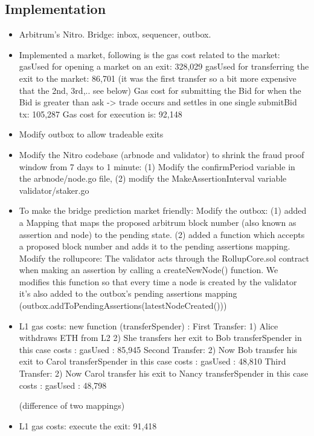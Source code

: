 \subsection{Implementation} 

\begin{itemize}
\item Arbitrum's Nitro. Bridge: inbox, sequencer, outbox.
\item Implemented a market, following is the gas cost related to the market:
gasUsed for opening a market on an exit: 328,029
gasUsed for transferring the exit to the market:  86,701 (it was the first transfer so a bit more expensive that the 2nd, 3rd,.. see below)
Gas cost for submitting the Bid for when the Bid is greater than ask -> trade occurs and settles in one single submitBid tx:  105,287
Gas cost for execution is: 92,148
\item Modify outbox to allow tradeable exits
\item Modify the Nitro codebase (arbnode and validator) to shrink the fraud proof window from 7 days to 1 minute: (1) Modify the confirmPeriod variable in the arbnode/node.go file, (2) modify the MakeAssertionInterval variable validator/staker.go
\item To make the bridge prediction market friendly: 
Modify the outbox: (1) added a Mapping that maps the proposed arbitrum block number (also known as assertion and node) to the pending state. (2) added a function which accepts a proposed block number and adds it to the pending assertions mapping.
Modify the rollupcore: The validator acts through the RollupCore.sol contract when making an assertion by calling a createNewNode() function. We modifies this function so that every time a node is created by the validator it's also added to the outbox's pending assertions mapping (outbox.addToPendingAssertions(latestNodeCreated()))

\item L1 gas costs: new function (transferSpender) : 
First Transfer: 
1) Alice withdraws ETH from L2
2) She transfers her exit to Bob
transferSpender in this case costs : gasUsed : 85,945
Second Transfer: 
2) Now Bob transfer his exit to Carol
transferSpender in this case costs : gasUsed : 48,810
Third Transfer:
2) Now Carol transfer his exit to Nancy
transferSpender in this case costs : gasUsed : 48,798

 (difference of two mappings)

\item L1 gas costs: execute the exit: 91,418


\end{itemize}
